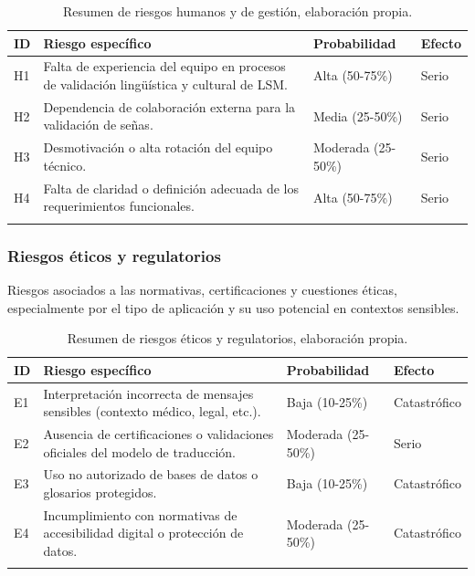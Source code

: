 \begin{longtable}{|>{\centering\arraybackslash}p{0.8cm}|>{\raggedright\arraybackslash}p{3.5cm}|>{\raggedright\arraybackslash}p{5.1cm}|>{\raggedright\arraybackslash}p{5.1cm}|}
	\hline
	\textbf{ID} & \textbf{Riesgo específico} & \textbf{Probabilidad} & \textbf{Efecto} \\
	\hline
	H1 & Falta de experiencia del equipo en procesos de validación lingüística y cultural de LSM. & Alta (50-75\%) & Serio \\
	\hline
	H2 & Dependencia de colaboración externa para la validación de señas. & Media (25-50\%) & Serio \\
	\hline
	H3 & Desmotivación o alta rotación del equipo técnico. & Moderada (25-50\%) & Serio \\
	\hline
	H4 & Falta de claridad o definición adecuada de los requerimientos funcionales. & Alta (50-75\%) & Serio \\
	\hline
\caption[Resumen de riesgos humanos y de gestión]{Resumen de riesgos humanos y de gestión, elaboración propia.} \label{tab:riesgos_humanoss_resumen} \\
\end{longtable}

\subsubsection{Riesgos éticos y regulatorios}
Riesgos asociados a las normativas, certificaciones y cuestiones éticas, especialmente por el tipo de aplicación y su uso potencial en contextos sensibles.

\setlength{\tabcolsep}{4pt}
\renewcommand{\arraystretch}{1.2}

\begin{longtable}{|>{\centering\arraybackslash}p{0.8cm}|>{\raggedright\arraybackslash}p{3.5cm}|>{\raggedright\arraybackslash}p{5.1cm}|>{\raggedright\arraybackslash}p{5.1cm}|}
	\hline
	\textbf{ID} & \textbf{Riesgo específico} & \textbf{Probabilidad} & \textbf{Efecto} \\
	\hline
	E1 & Interpretación incorrecta de mensajes sensibles (contexto médico, legal, etc.). & Baja (10-25\%) & Catastrófico \\
	\hline
	E2 & Ausencia de certificaciones o validaciones oficiales del modelo de traducción. & Moderada (25-50\%) & Serio \\
	\hline
	E3 & Uso no autorizado de bases de datos o glosarios protegidos. & Baja (10-25\%) & Catastrófico \\
	\hline
	E4 & Incumplimiento con normativas de accesibilidad digital o protección de datos. & Moderada (25-50\%) & Catastrófico \\
	\hline
\caption[Resumen de riesgos éticos y regulatorios]{Resumen de riesgos éticos y regulatorios, elaboración propia.} \label{tab:riesgos_eticos_resumen} \\
\end{longtable}


